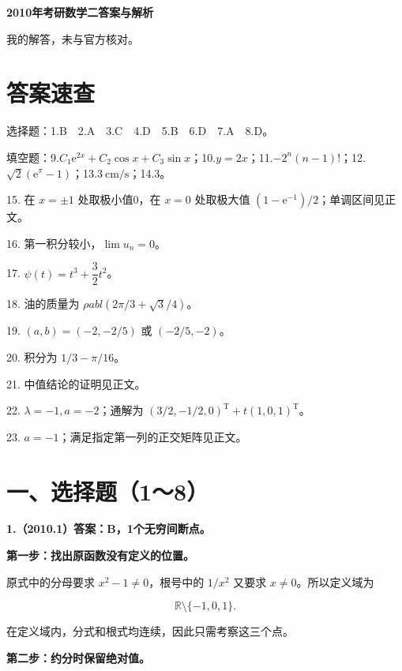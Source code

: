\documentclass[UTF8,11pt,fontset=windows]{ctexart}
\begin{document}
{\LARGE\bfseries 2010年考研数学二答案与解析\par}\vspace{6pt}

\begingroup\color{gray}我的解答，未与官方核对。\par\endgroup

\section*{答案速查}

\begingroup\color{gray}选择题：1.B　2.A　3.C　4.D　5.B　6.D　7.A　8.D。\par\endgroup

\begingroup\color{gray}填空题：9.$C_1\mathrm e^{2x}+C_2\cos x+C_3\sin x$；10.$y=2x$；11.$-2^n(n-1)!$；12.$\sqrt2(\mathrm e^\pi-1)$；13.$3\ \mathrm{cm/s}$；14.$3$。\par\endgroup

15. 在 $x=\pm1$ 处取极小值0，在 $x=0$ 处取极大值 $(1-\mathrm e^{-1})/2$；单调区间见正文。

16. 第一积分较小，$\lim u_n=0$。

17. $\psi(t)=t^3+\dfrac32t^2$。

18. 油的质量为 $\rho abl(2\pi/3+\sqrt3/4)$。

19. $(a,b)=(-2,-2/5)$ 或 $(-2/5,-2)$。

20. 积分为 $1/3-\pi/16$。

21. 中值结论的证明见正文。

22. $\lambda=-1,a=-2$；通解为 $(3/2,-1/2,0)^{\mathrm T}+t(1,0,1)^{\mathrm T}$。

23. $a=-1$；满足指定第一列的正交矩阵见正文。

\clearpage

\section*{一、选择题（1～8）}

\textbf{1.（2010.1）答案：B，1个无穷间断点。}

\textbf{第一步：找出原函数没有定义的位置。}

原式中的分母要求 $x^2-1\ne0$，根号中的 $1/x^2$ 又要求 $x\ne0$。所以定义域为

$$
\mathbb R\setminus\{-1,0,1\}.
$$

在定义域内，分式和根式均连续，因此只需考察这三个点。

\textbf{第二步：约分时保留绝对值。}
\end{document}

